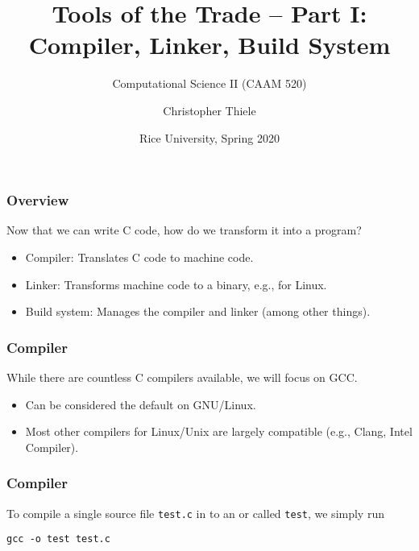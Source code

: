 \documentclass[12pt,t]{beamer}
\let\emph\relax %
\newcommand{\cmd}[1]{\begin{center}\texttt{#1}\end{center}}
\begin{document}
  \title{Tools of the Trade -- Part I:\\Compiler, Linker, Build System}
  \subtitle{Computational Science II (CAAM 520)}
  \author{Christopher Thiele}
  \date{Rice University, Spring 2020}

  \begin{frame}
    \titlepage
  \end{frame}


  \begin{frame}[fragile]
    \frametitle{Overview}

    Now that we can write C code, how do we transform it into a program?
    \begin{itemize}
      \item Compiler: Translates C code to machine code.
      \item Linker: Transforms machine code to a binary, e.g., for Linux.
      \item Build system: Manages the compiler and linker (among other things).
    \end{itemize}
  \end{frame}

  \begin{frame}[fragile]
    \frametitle{Compiler}

    While there are countless C compilers available, we will focus on GCC.
    \begin{itemize}
      \item Can be considered the default on GNU/Linux.
      \item Most other compilers for Linux/Unix are largely compatible (e.g., Clang, Intel Compiler).
    \end{itemize}
  \end{frame}

  \begin{frame}[fragile]
    \frametitle{Compiler}

    To compile a single source file \texttt{test.c} in to an \emph{executable} or \emph{binary} called \texttt{test}, we simply run
    \cmd{gcc -o test test.c}
  \end{frame}
\end{document}
